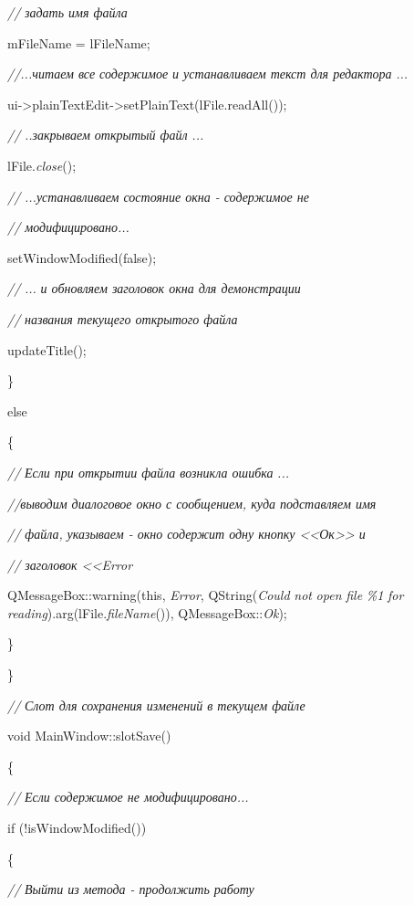\textit{//} \textit{задать имя файла}\textit{ }

 mFileName = lFileName;

\textit{//...}\textit{читаем все содержимое и устанавливаем текст для редактора}\textit{ }\textit{...}

ui-{>}plainTextEdit-{>}setPlainText(lFile.readAll());

\textit{//} \textit{..}\textit{закрываем открытый файл}\textit{ }\textit{...}

lFile.\textit{close}();

\textit{//} \textit{...}\textit{устанавливаем состояние окна - содержимое не}

\textit{// модифицировано}\textit{...}

 setWindowModified(false);

\textit{//} \textit{...} \textit{и обновляем заголовок окна для демонстрации}\textit{ }

\textit{//} \textit{названия текущего открытого файла}\textit{ }

 updateTitle();

\}

else

\{

 \textit{//} \textit{Если при открытии файла возникла ошибка}\textit{ }\textit{...}

\textit{//}\textit{выводим диалоговое окно с сообщением, куда подставляем имя}

\textit{// файла}\textit{,}\textit{ }\textit{указываем - окно содержит одну кнопку <<Ок>> и}

\textit{// заголовок <<Error}\textit{ }

QMessageBox::warning(this, \textit{Error}, QString(\textit{Could} \textit{not} \textit{open}
\textit{file} \textit{\%1} \textit{for} \textit{reading}).arg(lFile.\textit{fileName}()),
QMessageBox::\textit{Ok});

\}

\}

\textit{//} \textit{Слот для сохранения изменений в текущем файле}\textit{ }

void MainWindow::slotSave()

\{

\textit{//} \textit{Если содержимое не модифицировано}\textit{...}

if (!isWindowModified())

\{

\textit{//} \textit{Выйти из метода - продолжить работу}\textit{ }

